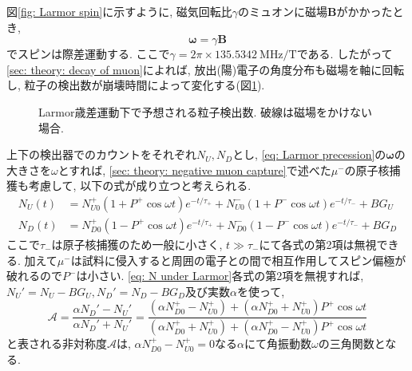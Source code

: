 \documentclass[dvipdfmx]{jsarticle}
\begin{document}
図\ref{fig: Larmor spin}に示すように, 磁気回転比$\gamma$のミュオンに磁場$\bm{B}$がかかったとき,
\begin{equation}
    \label{eq: Larmor precession}
    \bm{\omega}=\gamma\bm{B}
\end{equation}
でスピンは際差運動する.
ここで$\gamma=2\pi\times\SI{135.5342}{\mega\hertz/\tesla}$である\cite{Kadono Adachi Ono Inada Ito Oniyanagi Ootomo Hyodo}.
したがって\ref{sec: theory: decay of muon}によれば, 放出(陽)電子の角度分布も磁場を軸に回転し, 粒子の検出数が崩壊時間によって変化する(図\ref{fig: theory: N under Larmor}).

\begin{figure}
    \centering
    
    \caption[]{Larmor歳差運動下で予想される粒子検出数. 破線は磁場をかけない場合. }
    \label{fig: theory: N under Larmor}
\end{figure}

上下の検出器でのカウントをそれぞれ$N_U, N_D$とし, \eqref{eq: Larmor precession}の$\bm{\omega}$の大きさを$\omega$とすれば, \ref{sec: theory: negative muon capture}で述べた$\mu^-$の原子核捕獲も考慮して, 以下の式が成り立つと考えられる.
\begin{equation}
    \label{eq: N under Larmor}
    \begin{split}
        N_U(t)
        &=
        N_{U0}^+(1+P^+\cos\omega t)e^{-t/\tau_+}
        +
        N_{U0}^-(1+P^-\cos\omega t)e^{-t/\tau_-}
        +
        BG_U
        \\
        N_D(t)
        &=
        N_{D0}^+(1-P^+\cos\omega t)e^{-t/\tau_+}
        +
        N_{D0}^-(1-P^-\cos\omega t)e^{-t/\tau_-}
        +
        BG_D
    \end{split}
\end{equation}
ここで$\tau_-$は原子核捕獲のため一般に小さく, $t\gg\tau_-$にて各式の第2項は無視できる.
加えて$\mu^-$は試料に侵入すると周囲の電子との間で相互作用してスピン偏極が破れるので$P^-$は小さい.
\eqref{eq: N under Larmor}各式の第2項を無視すれば, $N_U'=N_U-BG_U, N_D'=N_D-BG_D$及び実数$\alpha$を使って,
\begin{equation}
    \label{eq: asymmetry}
    \mathscr{A}
    =
    \frac{\alpha N_D'-N_U'}{\alpha N_D'+N_U'}
    =
    \frac{(\alpha N_{D0}^+-N_{U0}^+)+(\alpha N_{D0}^++N_{U0}^+)P^+\cos\omega t}{(\alpha N_{D0}^++N_{U0}^+)+(\alpha N_{D0}^+-N_{U0}^+)P^+\cos\omega t}
\end{equation}
と表される非対称度$\mathscr{A}$は, $\alpha N_{D0}^+-N_{U0}^+=0$なる$\alpha$にて角振動数$\omega$の三角関数となる.
\end{document}
